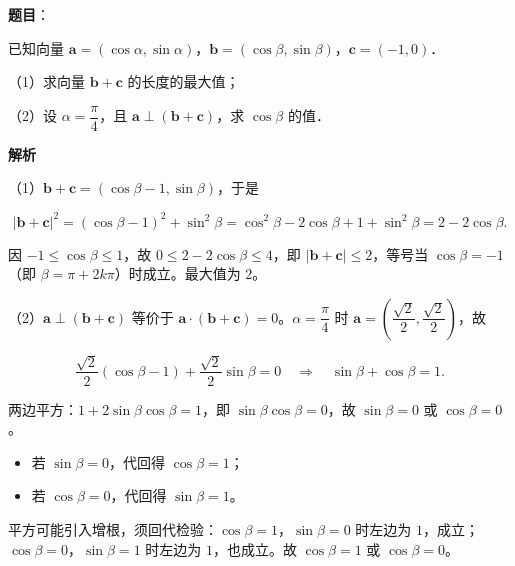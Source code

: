 \begin{answer}

\textbf{题目}：

已知向量 $\boldsymbol a=(\cos\alpha,\sin\alpha)$，$\boldsymbol b=(\cos\beta,\sin\beta)$，$\boldsymbol c=(-1,0)$．

（1）求向量 $\boldsymbol b+\boldsymbol c$ 的长度的最大值；

（2）设 $\alpha=\dfrac\pi4$，且 $\boldsymbol a\perp(\boldsymbol b+\boldsymbol c)$，求 $\cos\beta$ 的值．

\textbf{解析}

（1）$\boldsymbol b+\boldsymbol c=(\cos\beta-1,\sin\beta)$，于是

\nopagebreak[4]
\[|\boldsymbol b+\boldsymbol c|^2=(\cos\beta-1)^2+\sin^2\beta=\cos^2\beta-2\cos\beta+1+\sin^2\beta=2-2\cos\beta.\]

因 $-1\leqslant\cos\beta\leqslant1$，故 $0\leqslant2-2\cos\beta\leqslant4$，即 $|\boldsymbol b+\boldsymbol c|\leqslant2$，等号当 $\cos\beta=-1$（即 $\beta=\pi+2k\pi$）时成立。最大值为 $2$。

（2）$\boldsymbol a\perp(\boldsymbol b+\boldsymbol c)$ 等价于 $\boldsymbol a\cdot(\boldsymbol b+\boldsymbol c)=0$。$\alpha=\dfrac\pi4$ 时 $\boldsymbol a=\left(\dfrac{\sqrt2}{2},\dfrac{\sqrt2}{2}\right)$，故

\nopagebreak[4]
\[\frac{\sqrt2}{2}(\cos\beta-1)+\frac{\sqrt2}{2}\sin\beta=0\quad\Longrightarrow\quad\sin\beta+\cos\beta=1.\]

两边平方：$1+2\sin\beta\cos\beta=1$，即 $\sin\beta\cos\beta=0$，故 $\sin\beta=0$ 或 $\cos\beta=0$。

\begin{itemize}
\item 若 $\sin\beta=0$，代回得 $\cos\beta=1$；
\item 若 $\cos\beta=0$，代回得 $\sin\beta=1$。
\end{itemize}

平方可能引入增根，须回代检验：$\cos\beta=1$，$\sin\beta=0$ 时左边为 $1$，成立；$\cos\beta=0$，$\sin\beta=1$ 时左边为 $1$，也成立。故 $\cos\beta=1$ 或 $\cos\beta=0$。


\end{answer}
